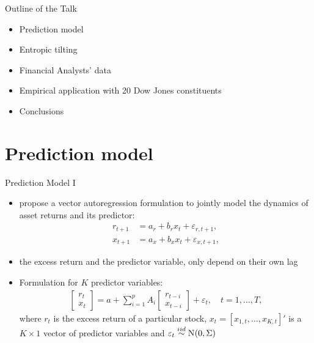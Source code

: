 \documentclass[9pt,xcolor=x11names,compress]{beamer}
\let\natbibcitep\citep
\renewcommand\citep{\bibpunct{(}{)}{;}{a}{,}{;}\natbibcitep}
\let\oldcite=\cite
\renewcommand{\cite}[1]{\textcolor{dblue}{\oldcite{#1}}}
\theoremstyle{standard}
\theoremstyle{notes}
\newcommand{\No}[1]{\text{N}\hspace{-0.05cm}\left(#1\right)}
\begin{document}
\begin{frame}{Outline of the Talk}
	\begin{itemize}
		\item Prediction model
		\item Entropic tilting \citep{krueger2015}
		\item Financial Analysts' data
		\item Empirical application with 20 Dow Jones constituents
		\item Conclusions
	\end{itemize}
\end{frame}

\section{Prediction model}

\begin{frame}{Prediction Model I}
	\begin{itemize}
		\item \cite{kandel1987} propose a vector autoregression formulation to jointly model the dynamics of asset returns and its predictor:
		\begin{align}
		\label{eqn:ks1987}
		r_{t+1}&=a_r+b_rx_t+\varepsilon_{r,t+1},\\
		x_{t+1}&=a_x+b_xx_t+\varepsilon_{x,t+1},\label{eqn:ks1987_2}
		\end{align}
		\item the excess return and the predictor variable, only depend on their own lag
		\item Formulation for $K$ predictor variables:
		\begin{align}\label{eqn:varp}
		\begin{bmatrix}r_t\\x_t\end{bmatrix}=a+\sum_{i=1}^pA_i\begin{bmatrix}r_{t-i}\\x_{t-i}\end{bmatrix}+\varepsilon_t,\quad t=1,\ldots,T,	
		\end{align}
		where $r_t$ is the excess return of a particular stock, $x_t=[x_{1,t},\ldots,x_{K,t}]'$ is a $K\times1$ vector of predictor variables and $\varepsilon_t\stackrel{iid}{\sim}\No{0,\Sigma}$
	\end{itemize}
\end{frame}
\end{document}
